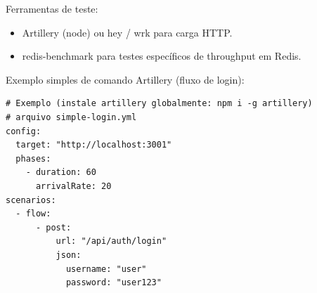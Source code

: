 \documentclass[12pt]{article}
\begin{document}
Ferramentas de teste:
\begin{itemize}
  \item Artillery (node) ou hey / wrk para carga HTTP.
  \item redis-benchmark para testes específicos de throughput em Redis.
\end{itemize}

Exemplo simples de comando Artillery (fluxo de login):
\begin{verbatim}
# Exemplo (instale artillery globalmente: npm i -g artillery)
# arquivo simple-login.yml
config:
  target: "http://localhost:3001"
  phases:
    - duration: 60
      arrivalRate: 20
scenarios:
  - flow:
      - post:
          url: "/api/auth/login"
          json:
            username: "user"
            password: "user123"
\end{verbatim}
\end{document}
